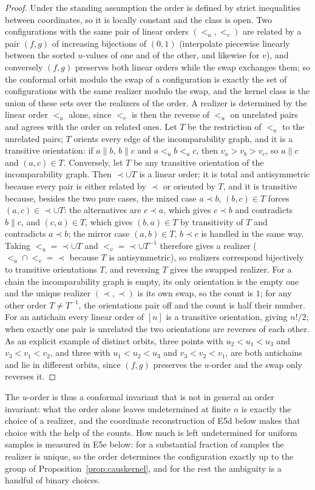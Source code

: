 \documentclass[11pt,a4paper]{article}
\theoremstyle{plain}
\theoremstyle{definition}
\theoremstyle{remark}
\newcommand{\incomp}{\parallel}
\begin{document}
\begin{proof}
Under the standing assumption the order is defined by strict inequalities between coordinates, so it is locally constant and the class is open. Two configurations with the same pair of linear orders $(<_u,<_v)$ are related by a pair $(f,g)$ of increasing bijections of $(0,1)$ (interpolate piecewise linearly between the sorted $u$-values of one and of the other, and likewise for $v$), and conversely $(f,g)$ preserves both linear orders while the swap exchanges them; so the conformal orbit modulo the swap of a configuration is exactly the set of configurations with the same realizer modulo the swap, and the kernel class is the union of these sets over the realizers of the order. A realizer is determined by the linear order $<_u$ alone, since $<_v$ is then the reverse of $<_u$ on unrelated pairs and agrees with the order on related ones. Let $T$ be the restriction of $<_u$ to the unrelated pairs; $T$ orients every edge of the incomparability graph, and it is a transitive orientation: if $a\incomp b$, $b\incomp c$ and $a<_u b<_u c$, then $v_a>v_b>v_c$, so $a\incomp c$ and $(a,c)\in T$. Conversely, let $T$ be any transitive orientation of the incomparability graph. Then $\prec\cup T$ is a linear order: it is total and antisymmetric because every pair is either related by $\prec$ or oriented by $T$, and it is transitive because, besides the two pure cases, the mixed case $a\prec b$, $(b,c)\in T$ forces $(a,c)\in\prec\cup T$: the alternatives are $c\prec a$, which gives $c\prec b$ and contradicts $b\incomp c$, and $(c,a)\in T$, which gives $(b,a)\in T$ by transitivity of $T$ and contradicts $a\prec b$; the mirror case $(a,b)\in T$, $b\prec c$ is handled in the same way. Taking $<_u=\prec\cup T$ and $<_v=\prec\cup T^{-1}$ therefore gives a realizer ($<_u\cap<_v=\prec$ because $T$ is antisymmetric), so realizers correspond bijectively to transitive orientations $T$, and reversing $T$ gives the swapped realizer. For a chain the incomparability graph is empty, its only orientation is the empty one and the unique realizer $(\prec,\prec)$ is its own swap, so the count is $1$; for any other order $T\ne T^{-1}$, the orientations pair off and the count is half their number. For an antichain every linear order of $[n]$ is a transitive orientation, giving $n!/2$; when exactly one pair is unrelated the two orientations are reverses of each other. As an explicit example of distinct orbits, three points with $u_2<u_1<u_3$ and $v_3<v_1<v_2$, and three with $u_1<u_2<u_3$ and $v_3<v_2<v_1$, are both antichains and lie in different orbits, since $(f,g)$ preserves the $u$-order and the swap only reverses it.
\end{proof}
The $u$-order is thus a conformal invariant that is not in general an order invariant: what the order alone leaves undetermined at finite $n$ is exactly the choice of a realizer, and the coordinate reconstruction of E5d below makes that choice with the help of the counts. How much is left undetermined for uniform samples is measured in E5e below: for a substantial fraction of samples the realizer is unique, so the order determines the configuration exactly up to the group of Proposition~\ref{prop:causkernel}, and for the rest the ambiguity is a handful of binary choices.
\end{document}
